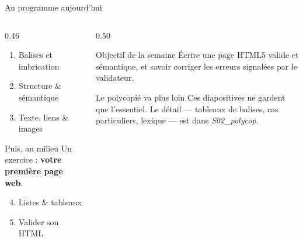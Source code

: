 \documentclass[aspectratio=169,11pt]{beamer}
\begin{document}
\begin{frame}{Au programme aujourd'hui}
  \begin{columns}[T]
    \begin{column}{0.46\textwidth}
      \begin{enumerate}
        \item Balises et imbrication
        \item Structure \& sémantique
        \item Texte, liens \& images
      \end{enumerate}
      \vspace{0.15cm}
      \begin{exampleblock}{Puis, au milieu}
        Un exercice : \textbf{votre première page web}.
      \end{exampleblock}
      \vspace{0.1cm}
      \begin{enumerate}
        \setcounter{enumi}{3}
        \item Listes \& tableaux
        \item Valider son HTML
      \end{enumerate}
    \end{column}
    \begin{column}{0.50\textwidth}
      \begin{block}{Objectif de la semaine}
        Écrire une page HTML5 valide et sémantique, et savoir corriger les erreurs signalées par le validateur.
      \end{block}
      \vspace{0.15cm}
      \begin{alertblock}{Le polycopié va plus loin}
        Ces diapositives ne gardent que l'essentiel. Le détail --- tableaux de balises, cas particuliers, lexique --- est dans \textit{S02\_polycop}.
      \end{alertblock}
    \end{column}
  \end{columns}
\end{frame}
\end{document}

